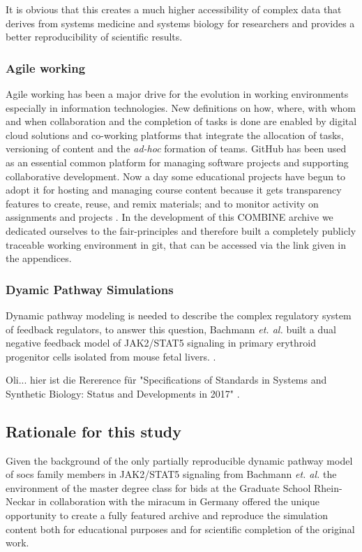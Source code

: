 It is obvious that this creates a much higher accessibility of complex data that derives from systems medicine and systems biology for researchers and provides a better reproducibility of scientific results.

\subsubsection*{Agile working}
Agile working has been a major drive for the evolution in working environments especially in information technologies. New definitions on how, where, with whom and when collaboration and the completion of tasks is done are enabled by digital cloud solutions and co-working platforms that integrate the allocation of tasks, versioning of content and the \textit{ad-hoc} formation of teams. GitHub has been used as an essential common platform for managing software projects and supporting collaborative development. Now a day some educational projects have begun to adopt it for hosting and managing course content because it gets transparency features to create, reuse, and remix materials; and to monitor activity on assignments and projects \cite{github}. In the development of this COMBINE archive we dedicated ourselves to the \ac{fair}-principles and therefore built a completely publicly traceable working environment in git, that can be accessed via the link given in the appendices.

\subsubsection*{Dyamic Pathway Simulations}
Dynamic pathway modeling is needed to describe the complex regulatory system of feedback regulators, to answer this question, Bachmann \textit{et. al.} built a dual negative feedback model of JAK2/STAT5 signaling in primary erythroid progenitor cells isolated from mouse fetal livers. \cite{bachmannmodel}.

{\Huge Oli}... hier ist die Rererence für "Specifications of Standards in Systems and Synthetic Biology: Status and Developments in 2017" \cite{specificationsb}.



\subsection*{Rationale for this study}
Given the background of the only partially reproducible dynamic pathway model of \ac{socs} family members in JAK2/STAT5 signaling from Bachmann \textit{et. al.} \cite{bachmannmodel} the environment of the master degree class for \ac{bids} at the Graduate School Rhein-Neckar  in  collaboration  with  the \ac{miracum} in Germany offered the unique opportunity to create a fully featured archive and reproduce the simulation content both for educational purposes and for scientific completion of the original work. 

